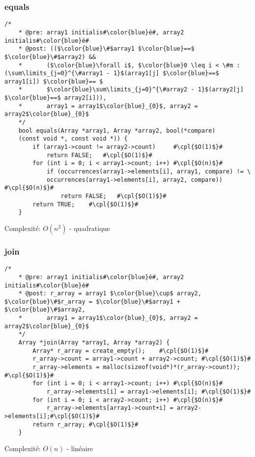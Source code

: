\documentclass[a4paper, 11pt, oneside]{article}
\begin{document}
	\clearpage
	\subsubsection{equals}
	\begin{lstlisting}[mathescape]
	/*
	* @pre: array1 initialis#\color{blue}é#, array2 initialis#\color{blue}é#
	* @post: (($\color{blue}\#$array1 $\color{blue}==$ $\color{blue}\#$array2) && 
	*		($\color{blue}\forall i$, $\color{blue}0 \leq i < \#m : (\sum\limits_{j=0}^{\#array1 - 1}$(array1[j] $\color{blue}==$ array1[i]) $\color{blue}== $
	*		$\color{blue}\sum\limits_{j=0}^{\#array2 - 1}$(array2[j] $\color{blue}==$ array2[i])),
	*		array1 = array1$\color{blue}_{0}$, array2 = array2$\color{blue}_{0}$
	*/
	bool equals(Array *array1, Array *array2, bool(*compare)    
	(const void *, const void *)) {
		if (array1->count != array2->count)		#\cpl{$O(1)$}#
			return FALSE;	#\cpl{$O(1)$}#
		for (int i = 0; i < array1->count; i++)	#\cpl{$O(n)$}#
			if (occurrences(array1->elements[i], array1, compare) != \
			occurrences(array1->elements[i], array2, compare))	#\cpl{$O(n)$}#
				return FALSE;	#\cpl{$O(1)$}#
		return TRUE;	#\cpl{$O(1)$}#
	}
	\end{lstlisting}
	Complexité: $O(n^2)$ - quadratique
	
	\subsubsection{join}
	\begin{lstlisting}[mathescape]
	/*
	* @pre: array1 initialis#\color{blue}é#, array2 initialis#\color{blue}é#
	* @post: r_array = array1 $\color{blue}\cup$ array2, $\color{blue}\#$r_array = $\color{blue}\#$array1 + $\color{blue}\#$array2,
	*		array1 = array1$\color{blue}_{0}$, array2 = array2$\color{blue}_{0}$
	*/
	Array *join(Array *array1, Array *array2) {
		Array* r_array = create_empty();	#\cpl{$O(1)$}#
		r_array->count = array1->count + array2->count;	#\cpl{$O(1)$}#
		r_array->elements = malloc(sizeof(void*)*(r_array->count));	#\cpl{$O(1)$}#
		for (int i = 0; i < array1->count; i++)	#\cpl{$O(n)$}#
			r_array->elements[i] = array1->elements[i];	#\cpl{$O(1)$}#
		for (int i = 0; i < array2->count; i++)	#\cpl{$O(n)$}#
			r_array->elements[array1->count+i] = array2->elements[i];#\cpl{$O(1)$}#
		return r_array;	#\cpl{$O(1)$}#
	}
	\end{lstlisting}
	Complexité: $O(n)$ - linéaire
	
	\clearpage
\end{document}

